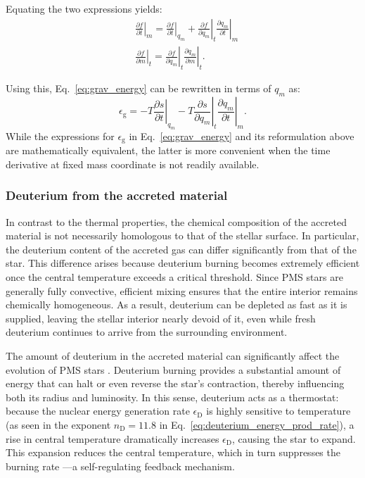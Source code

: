 \documentclass[12pt,a4paper]{article}
\newcommand{\mr}{\mathrm}
\newcommand{\pfird}[2][]{\frac{\partial#1}{\partial#2}}
\begin{document}
Equating the two expressions yields:
\begin{align}
  &\left.\pfird[f]{t}\right|_m = \left.\pfird[f]{t}\right|_{q_m} + \left.\pfird[f]{q_m}\right|_t \left.\pfird[q_m]{t}\right|_m \label{eq:coord_transf1}\\
  &\left.\pfird[f]{m}\right|_t = \left.\pfird[f]{q_m}\right|_t\left.\pfird[q_m]{m}\right|_t. \label{eq:coord_transf2}
\end{align}

Using this, Eq.~\eqref{eq:grav_energy} can be rewritten in terms of $q_m$ as:
\begin{equation}
   \epsilon_\mr{g} = -T \left.\pfird[s]{t}\right|_{q_m} - T \left.\pfird[s]{q_m}\right|_t\left.\pfird[q_m]{t}\right|_m.
\end{equation}
While the expressions for $\epsilon_\mr{g}$ in Eq.~\eqref{eq:grav_energy} and its reformulation above are mathematically equivalent, the latter is more convenient when the time derivative at fixed mass coordinate is not readily available.

\subsubsection{Deuterium from the accreted material}
\label{sec:deuterium_burning}

In contrast to the thermal properties, the chemical composition of the accreted material is not necessarily homologous to that of the stellar surface. In particular, the deuterium content of the accreted gas can differ significantly from that of the star. This difference arises because deuterium burning becomes extremely efficient once the central temperature exceeds a critical threshold. Since PMS stars are generally fully convective, efficient mixing ensures that the entire interior remains chemically homogeneous. As a result, deuterium can be depleted as fast as it is supplied, leaving the stellar interior nearly devoid of it, even while fresh deuterium continues to arrive from the surrounding environment.

The amount of deuterium in the accreted material can significantly affect the evolution of PMS stars \parencite[e.g.,][]{KunitomoEtAl2017,AmardMatt2023}. Deuterium burning provides a substantial amount of energy that can halt or even reverse the star's contraction, thereby influencing both its radius and luminosity. In this sense, deuterium acts as a thermostat: because the nuclear energy generation rate $\epsilon_\mr{D}$ is highly sensitive to temperature (as seen in the exponent $n_\mr{D} = 11.8$ in Eq.~\eqref{eq:deuterium_energy_prod_rate}), a rise in central temperature dramatically increases $\epsilon_\mr{D}$, causing the star to expand. This expansion reduces the central temperature, which in turn suppresses the burning rate \parencite{StahlerPalla2004}—a self-regulating feedback mechanism.
\end{document}
